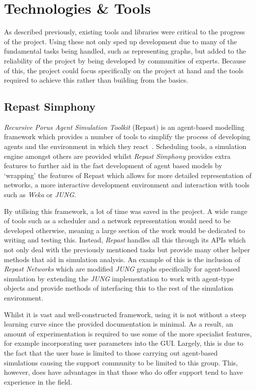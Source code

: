 \documentclass[]{report}
\begin{document}
\section{Technologies \& Tools}
As described previously, existing tools and libraries were critical to the progress of the project. Using these not only sped up development due to many of the fundamental tasks being handled, such as representing graphs, but added to the reliability of the project by being developed by communities of experts. Because of this, the project could focus specifically on the project at hand and the tools required to achieve this rather than building from the basics.

\subsection{Repast Simphony}
\emph{Recursive Porus Agent Simulation Toolkit} (Repast) is an agent-based modelling framework which provides a number of tools to simplify the process of developing agents and the environment in which they react~\cite{repast-main}. Scheduling tools, a simulation engine amongst others are provided whilst \emph{Repast Simphony} provides extra features to further aid in the fast development of agent based models by `wrapping' the features of Repast which allows for more detailed representation of networks, a more interactive development environment and interaction with tools such as \emph{Weka} or \emph{JUNG}.

By utilising this framework, a lot of time was saved in the project. A wide range of tools such as a scheduler and a network representation would need to be developed otherwise, meaning a large section of the work would be dedicated to writing and testing this. Instead, \emph{Repast} handles all this through its APIs which not only deal with the previously mentioned tasks but provide many other helper methods that aid in simulation analysis. An example of this is the inclusion of \emph{Repast Networks} which are modified \emph{JUNG} graphs specifically for agent-based simulation by extending the \emph{JUNG} implementation to work with agent-type objects and provide methods of interfacing this to the rest of the simulation environment.

Whilst it is vast and well-constructed framework, using it is not without a steep learning curve since the provided documentation is minimal. As a result, an amount of experimentation is required to use some of the more specialist features, for example incorporating user parameters into the GUI. Largely, this is due to the fact that the user base is limited to those carrying out agent-based simulations causing the support community to be limited to this group. This, however, does have advantages in that those who do offer support tend to have experience in the field. 
\end{document}
